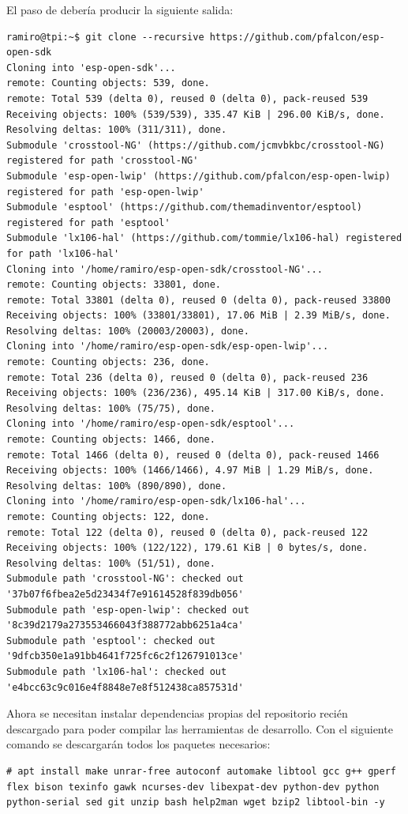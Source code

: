 El paso de  debería producir la siguiente salida:
\begin{lstlisting}
ramiro@tpi:~$ git clone --recursive https://github.com/pfalcon/esp-open-sdk
Cloning into 'esp-open-sdk'...
remote: Counting objects: 539, done.
remote: Total 539 (delta 0), reused 0 (delta 0), pack-reused 539
Receiving objects: 100% (539/539), 335.47 KiB | 296.00 KiB/s, done.
Resolving deltas: 100% (311/311), done.
Submodule 'crosstool-NG' (https://github.com/jcmvbkbc/crosstool-NG) registered for path 'crosstool-NG'
Submodule 'esp-open-lwip' (https://github.com/pfalcon/esp-open-lwip) registered for path 'esp-open-lwip'
Submodule 'esptool' (https://github.com/themadinventor/esptool) registered for path 'esptool'
Submodule 'lx106-hal' (https://github.com/tommie/lx106-hal) registered for path 'lx106-hal'
Cloning into '/home/ramiro/esp-open-sdk/crosstool-NG'...
remote: Counting objects: 33801, done.        
remote: Total 33801 (delta 0), reused 0 (delta 0), pack-reused 33800        
Receiving objects: 100% (33801/33801), 17.06 MiB | 2.39 MiB/s, done.
Resolving deltas: 100% (20003/20003), done.
Cloning into '/home/ramiro/esp-open-sdk/esp-open-lwip'...
remote: Counting objects: 236, done.        
remote: Total 236 (delta 0), reused 0 (delta 0), pack-reused 236        
Receiving objects: 100% (236/236), 495.14 KiB | 317.00 KiB/s, done.
Resolving deltas: 100% (75/75), done.
Cloning into '/home/ramiro/esp-open-sdk/esptool'...
remote: Counting objects: 1466, done.        
remote: Total 1466 (delta 0), reused 0 (delta 0), pack-reused 1466        
Receiving objects: 100% (1466/1466), 4.97 MiB | 1.29 MiB/s, done.
Resolving deltas: 100% (890/890), done.
Cloning into '/home/ramiro/esp-open-sdk/lx106-hal'...
remote: Counting objects: 122, done.        
remote: Total 122 (delta 0), reused 0 (delta 0), pack-reused 122        
Receiving objects: 100% (122/122), 179.61 KiB | 0 bytes/s, done.
Resolving deltas: 100% (51/51), done.
Submodule path 'crosstool-NG': checked out '37b07f6fbea2e5d23434f7e91614528f839db056'
Submodule path 'esp-open-lwip': checked out '8c39d2179a273553466043f388772abb6251a4ca'
Submodule path 'esptool': checked out '9dfcb350e1a91bb4641f725fc6c2f126791013ce'
Submodule path 'lx106-hal': checked out 'e4bcc63c9c016e4f8848e7e8f512438ca857531d'
\end{lstlisting}

Ahora se necesitan instalar dependencias propias del repositorio recién descargado para poder compilar las herramientas de desarrollo. Con el siguiente comando se descargarán todos los paquetes necesarios:
\begin{lstlisting}
# apt install make unrar-free autoconf automake libtool gcc g++ gperf flex bison texinfo gawk ncurses-dev libexpat-dev python-dev python python-serial sed git unzip bash help2man wget bzip2 libtool-bin -y
\end{lstlisting}

